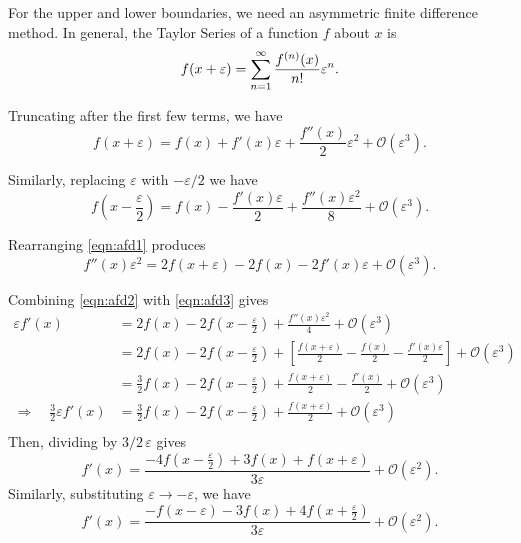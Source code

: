 For the upper and lower boundaries, we need an asymmetric finite difference
method.
In general, the Taylor Series of a function $f$ about $x$ is
\begin{equation*}
  f(x+\varepsilon) = \sum_{n=1}^\infty \frac{f^{(n)}(x)}{n!} \varepsilon^n. \\
\end{equation*}

Truncating after the first few terms, we have
\begin{equation}
  \label{eqn:afd1}
  f(x+\varepsilon)  = f(x) + f'(x)\varepsilon + \frac{f''(x)}{2}\varepsilon^2 + \mathcal{O}(\varepsilon^3).
\end{equation}

Similarly, replacing $\varepsilon$ with $-\varepsilon/2$ we have
\begin{equation}
  \label{eqn:afd2}
  f(x-\frac{\varepsilon}{2}) = f(x) - \frac{f'(x)\varepsilon}{2} + \frac{f''(x)\varepsilon^2}{8} + \mathcal{O}(\varepsilon^3).
\end{equation}

Rearranging \eqref{eqn:afd1} produces
\begin{equation}
  \label{eqn:afd3}
  f''(x)\varepsilon^2 = 2f(x+\varepsilon) - 2f(x) - 2f'(x)\varepsilon + \mathcal{O}(\varepsilon^3).
\end{equation}

Combining \eqref{eqn:afd2} with \eqref{eqn:afd3} gives
\begin{align*}
  \varepsilon f'(x) &= 2f(x) - 2f(x-\frac{\varepsilon}{2}) + \frac{f''(x)\varepsilon^2}{4} + \mathcal{O}(\varepsilon^3) \\
  &= 2f(x) - 2f(x-\frac{\varepsilon}{2}) + \left[ \frac{f(x+\varepsilon)}{2} - \frac{f(x)}{2} - \frac{f'(x)\varepsilon}{2} \right] + \mathcal{O}(\varepsilon^3) \\
  &= \frac{3}{2}f(x) - 2f(x-\frac{\varepsilon}{2}) + \frac{f(x+\varepsilon)}{2} - \frac{f'(x)}{2} + \mathcal{O}(\varepsilon^3) \\
 \Rightarrow \quad \frac{3}{2}\varepsilon f'(x) &= \frac{3}{2}f(x) - 2f(x-\frac{\varepsilon}{2}) + \frac{f(x+\varepsilon)}{2} + \mathcal{O}(\varepsilon^3) \\
\end{align*}
Then, dividing by $3/2\, \varepsilon$ gives
\begin{equation}
  f'(x) = \frac{-4f(x-\frac{\varepsilon}{2}) + 3f(x) + f(x+\varepsilon)}{3\varepsilon} + \mathcal{O}(\varepsilon^2).
\end{equation}
Similarly, substituting $\varepsilon \to -\varepsilon$, we have
\begin{equation}
  f'(x) = \frac{- f(x-\varepsilon) - 3f(x) + 4f(x+\frac{\varepsilon}{2})}{3\varepsilon} + \mathcal{O}(\varepsilon^2).
\end{equation}


